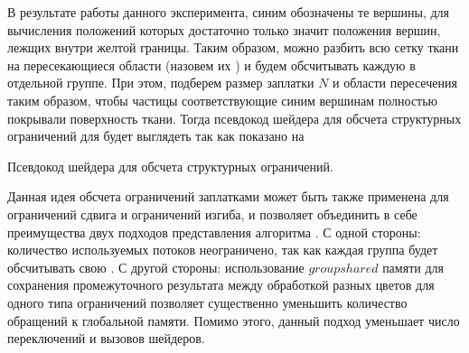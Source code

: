 	В результате работы данного эксперимента, синим обозначены те вершины, для вычисления положений которых достаточно только значит положения вершин, лежщих внутри желтой границы. Таким образом, можно разбить всю сетку ткани на пересекающиеся области (назовем их ) и будем обсчитывать каждую  в отдельной группе. При этом, подберем размер заплатки $N$ и области пересечения таким образом, чтобы частицы соответствующие синим вершинам полностью покрывали поверхность ткани. Тогда псевдокод шейдера для обсчета структурных ограничений для  будет выглядеть так как показано на 
	
	\begin{algorithm} [h]
		\nonl{}
	\caption{Псевдокод шейдера для обсчета структурных ограничений.}\label{alg:structuralChunk}
	\end{algorithm}
	
	Данная идея обсчета ограничений заплатками может быть также применена для ограничений сдвига и ограничений изгиба, и позволяет объединить в себе преимущества двух подходов представления алгоритма . С одной стороны: количество используемых потоков неограничено, так как каждая группа будет обсчитывать свою . С другой стороны: использование $groupshared$ памяти для сохранения промежуточного результата между обработкой разных цветов для одного типа ограничений позволяет существенно уменьшить количество обращений к глобальной памяти. Помимо этого, данный подход уменьшает число переключений и вызовов шейдеров.


%
